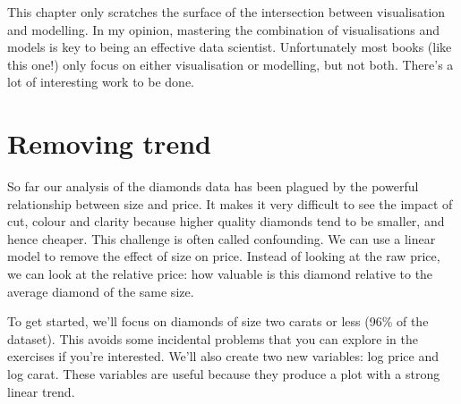 This chapter only scratches the surface of the intersection between
visualisation and modelling. In my opinion, mastering the combination of
visualisations and models is key to being an effective data scientist.
Unfortunately most books (like this one!) only focus on either
visualisation or modelling, but not both. There's a lot of interesting
work to be done.

\section{Removing trend}\label{sub:trend}

So far our analysis of the diamonds data has been plagued by the
powerful relationship between size and price. It makes it very difficult
to see the impact of cut, colour and clarity because higher quality
diamonds tend to be smaller, and hence cheaper. This challenge is often
called confounding. We can use a linear model to remove the effect of
size on price. Instead of looking at the raw price, we can look at the
relative price: how valuable is this diamond relative to the average
diamond of the same size. 

To get started, we'll focus on diamonds of size two carats or less (96\%
of the dataset). This avoids some incidental problems that you can
explore in the exercises if you're interested. We'll also create two new
variables: log price and log carat. These variables are useful because
they produce a plot with a strong linear trend.

